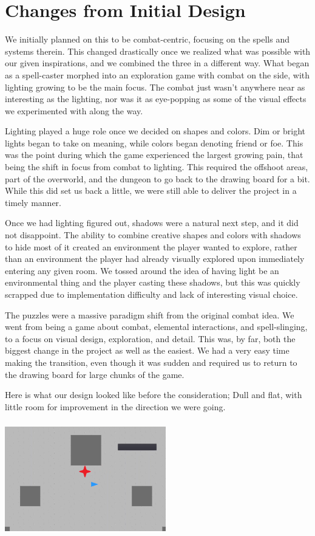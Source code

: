 \documentclass{sigchi}
\begin{document}
\section{Changes from Initial Design}
We initially planned on this to be combat-centric, focusing on the spells and systems therein.  This changed drastically once we realized what was possible with our given inspirations, and we combined 
the three in a different way.  What began as a spell-caster morphed into an exploration game with combat on the side, with lighting growing to be the main focus.  The combat just wasn't anywhere near
as interesting as the lighting, nor was it as eye-popping as some of the visual effects we experimented with along the way.

Lighting played a huge role once we decided on shapes and colors.  Dim or bright lights began to take on meaning, while colors began denoting friend or foe.  
This was the point during which the game experienced the largest growing pain, that being the shift in focus from combat to lighting.  
This required the offshoot areas, part of the overworld, and the dungeon to go back to the drawing board for a bit.  While this did set us back a little, we were still able to deliver the project in 
a timely manner.

Once we had lighting figured out, shadows were a natural next step, and it did not disappoint.  The ability to combine creative shapes and colors with shadows to hide most of it created 
an environment the player wanted to explore, rather than an environment the player had already visually explored upon immediately entering any given room.  We tossed around the idea 
of having light be an environmental thing and the player casting these shadows, but this was quickly scrapped due to implementation difficulty and lack of interesting visual choice.

The puzzles were a massive paradigm shift from the original combat idea.  We went from being a game about combat, elemental interactions, and spell-slinging, to a focus on visual design, 
exploration, and detail.  This was, by far, both the biggest change in the project as well as the easiest.  We had a very easy time making the transition, even though it was sudden and required us to return 
to the drawing board for large chunks of the game.

Here is what our design looked like before the consideration; Dull and flat, with little room for improvement in the direction we were going.

\includegraphics*[width=7cm, height=5cm]{./figures/earlyproj.png}
\end{document}
